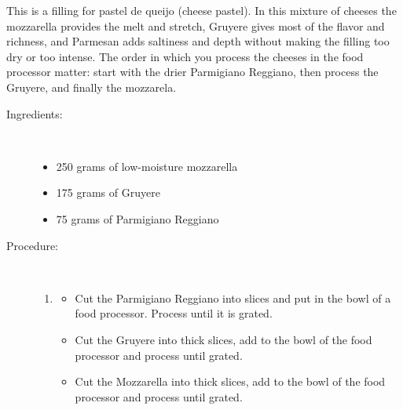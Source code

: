 \documentclass[11pt,letterpaper]{article}
\newcommand \fileName {CheeseFilling}
\begin{document}


This is a filling for pastel de queijo (cheese pastel). In this mixture of cheeses  the mozzarella provides the melt and stretch, Gruyere gives most of the flavor and richness, and Parmesan adds saltiness and depth without making the filling too dry or too intense. The order in which you process the cheeses in the food processor matter: start with the drier Parmigiano Reggiano, then process the Gruyere, and finally the mozzarela.
 
\begin{description}

\item[Ingredients:]\ \\
	\begin{itemize}
	\item 250 grams of low-moisture mozzarella 
	\item 175 grams of Gruyere
	\item 75 grams of  Parmigiano Reggiano
	\end{itemize}

\item[Procedure:]\ \\
	\begin{enumerate}
	\item[Process the block cheeses]
	\begin{itemize}
        \item Cut the   Parmigiano Reggiano into slices and put in the bowl of a food processor. Process until it is grated.
        \item Cut the Gruyere into thick slices, add to the bowl of the food processor and process until grated.
        \item Cut the Mozzarella into thick slices, add to the bowl of the food processor and process until grated.
        \end{itemize}
  	\end{enumerate}
\end{description}

%
\end{document}

